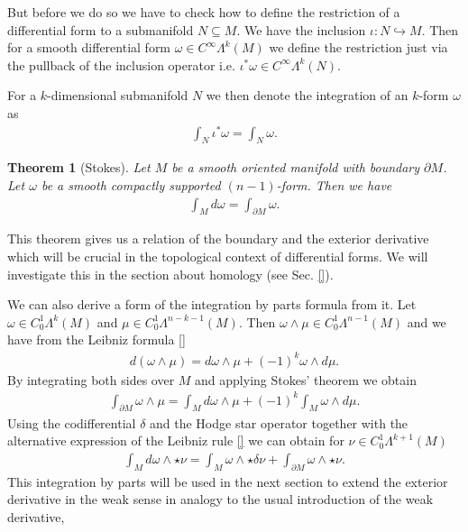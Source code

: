 \documentclass[12pt,a4paper]{article}
\numberwithin{equation}{subsection}
\numberwithin{lemma}{subsection}
\newtheorem{theorem}[lemma]{Theorem}
\theoremstyle{definition}
\begin{document}
But before we do so we have to check how to define the restriction of a
differential form to a submanifold $N \subseteq M$. 
We have the inclusion $\iota: N \hookrightarrow M$. Then for a 
smooth differential form $\omega \in C^\infty \Lambda^k (M)$ we define 
the restriction just via the pullback of the inclusion operator i.e. 
$\iota^* \omega \in C^\infty \Lambda^k(N)$. 

For a $k$-dimensional submanifold $N$ we then denote the integration of an 
$k$-form $\omega$ as
\begin{align*}
    \int_N \iota^*\omega = \int_N \omega.
\end{align*} 

\begin{theorem}[Stokes]
    Let $M$ be a smooth oriented manifold with boundary 
    $\partial M$. Let $\omega$ be 
    a smooth compactly supported $(n-1)$-form. Then we have 
    \begin{align*}
        \int_M d\omega = \int_{\partial M} \omega.
    \end{align*}
\end{theorem}
This theorem gives us a relation of the boundary and the exterior derivative 
which will be crucial in the topological context of differential forms.
We will investigate this in the section about homology (see Sec. \ref{}). 

We can also derive a form of the integration by parts formula from it. 
Let $\omega \in C_0^1 \Lambda^k (M)$ and $\mu \in C_0^1 \Lambda^{n-k-1}(M)$. 
Then $\omega \wedge \mu \in C_0^1 \Lambda^{n-1} (M)$ and we have from 
the Leibniz formula \ref{} 
\begin{align*}
    d(\omega \wedge \mu) = d\omega \wedge \mu + (-1)^k \omega \wedge d\mu. 
\end{align*}
By integrating both sides over $M$ and applying Stokes' theorem we obtain
\begin{align*}
    \int_{\partial M} \omega \wedge \mu 
    = \int_M d\omega \wedge \mu + (-1)^k \int_M \omega \wedge d\mu.
\end{align*}
Using the codifferential $\delta$ and the Hodge star operator together 
with the alternative expression of the Leibniz rule \ref{}
we can obtain for $\nu \in C^1_0 \Lambda^{k+1} (M)$
\begin{align*}
    \int_M d\omega \wedge \star \nu 
    = \int_M \omega \wedge \star \delta \nu  
        + \int_{\partial M} \omega \wedge \star \nu.
\end{align*}
This integration by parts will be used in the next section to extend the 
exterior derivative in the weak sense in analogy to the usual introduction 
of the weak derivative,
\end{document}
